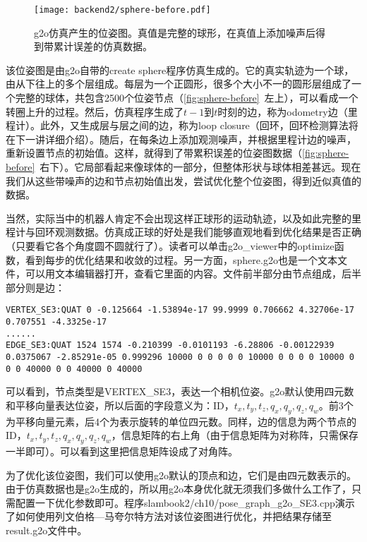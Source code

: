 \begin{figure}[!htp]
	\centering
	\texttt{[image: backend2/sphere-before.pdf]}
	\caption{g2o仿真产生的位姿图。真值是完整的球形，在真值上添加噪声后得到带累计误差的仿真数据。}
	\label{fig:sphere-before}
\end{figure}

该位姿图是由g2o自带的create sphere程序仿真生成的。它的真实轨迹为一个球，由从下往上的多个层组成。每层为一个正圆形，很多个大小不一的圆形层组成了一个完整的球体，共包含2500个位姿节点（\autoref{fig:sphere-before}~左上），可以看成一个转圈上升的过程。然后，仿真程序生成了$t-1$到$t$时刻的边，称为odometry边（里程计）。此外，又生成层与层之间的边，称为loop closure（回环，回环检测算法将在下一讲详细介绍）。随后，在每条边上添加观测噪声，并根据里程计边的噪声，重新设置节点的初始值。这样，就得到了带累积误差的位姿图数据（\autoref{fig:sphere-before}~右下）。它局部看起来像球体的一部分，但整体形状与球体相差甚远。现在我们从这些带噪声的边和节点初始值出发，尝试优化整个位姿图，得到近似真值的数据。

当然，实际当中的机器人肯定不会出现这样正球形的运动轨迹，以及如此完整的里程计与回环观测数据。仿真成正球的好处是我们能够直观地看到优化结果是否正确（只要看它各个角度圆不圆就行了）。读者可以单击g2o\_viewer中的optimize函数，看到每步的优化结果和收敛的过程。另一方面，sphere.g2o也是一个文本文件，可以用文本编辑器打开，查看它里面的内容。文件前半部分由节点组成，后半部分则是边：

\begin{lstlisting}
VERTEX_SE3:QUAT 0 -0.125664 -1.53894e-17 99.9999 0.706662 4.32706e-17 0.707551 -4.3325e-17 
......
EDGE_SE3:QUAT 1524 1574 -0.210399 -0.0101193 -6.28806 -0.00122939 0.0375067 -2.85291e-05 0.999296 10000 0 0 0 0 0 10000 0 0 0 0 10000 0 0 0 40000 0 0 40000 0 40000 
\end{lstlisting}

可以看到，节点类型是VERTEX\_SE3，表达一个相机位姿。g2o默认使用四元数和平移向量表达位姿，所以后面的字段意义为：ID，$t_x, t_y, t_z, q_x, q_y, q_z, q_w$。前3个为平移向量元素，后4个为表示旋转的单位四元数。同样，边的信息为两个节点的ID，$t_x, t_y, t_z, q_x, q_y, q_z, q_w$，信息矩阵的右上角（由于信息矩阵为对称阵，只需保存一半即可）。可以看到这里把信息矩阵设成了对角阵。

为了优化该位姿图，我们可以使用g2o默认的顶点和边，它们是由四元数表示的。由于仿真数据也是g2o生成的，所以用g2o本身优化就无须我们多做什么工作了，只需配置一下优化参数即可。程序slambook2/ch10/pose\_graph\_g2o\_SE3.cpp演示了如何使用列文伯格—马夸尔特方法对该位姿图进行优化，并把结果存储至result.g2o文件中。

